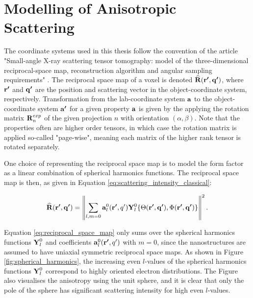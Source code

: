\section{Modelling of Anisotropic Scattering}
The coordinate systems used in this thesis follow the convention of the article "Small-angle X-ray scattering tensor tomography:
model of the three-dimensional reciprocal-space
map, reconstruction algorithm and angular
sampling requirements" \cite{liebi2018small}.
The reciprocal space map of a voxel is denoted $\bm{\mathrm{\widehat{R}}}(\bm{\mathrm{r'}}, \bm{\mathrm{q'}})$,
where $\bm{\mathrm{r'}}$ and $\bm{\mathrm{q'}}$ are the position and scattering vector in the object-coordinate system, respectively.
Transformation from the lab-coordinate system $\bm{\mathrm{a}}$ to the object-coordinate system $\bm{\mathrm{a'}}$ for a given property $\bm{\mathrm{a}}$
is given by the applying the rotation matrix $\bm{\mathrm{R}}_{n}^{exp}$ of the given projection $n$ with orientation $\left(\alpha,\beta\right)$.
Note that the properties often are higher order tensors, in which case the rotation matrix is applied so-called "page-wise",
meaning each matrix of the higher rank tensor is rotated separately.


One choice of representing the reciprocal space map is to model the form factor as a linear combination of spherical harmonics functions.
The reciprocal space map is then,
as given in Equation \eqref{eq:scattering_intensity_classical}:

\begin{equation}\label{eq:reciprocal_space_map}
    \bm{\mathrm{\widehat{R}}}(\bm{\mathrm{r'}}, \bm{\mathrm{q'}}) = \left\| \sum_{l, m=0} \bm{\mathrm{a}}_{l}^{0}(\bm{\mathrm{r'}}, q') \bm{\mathrm{Y}}_{l}^{0} \{ \Theta(\bm{\mathrm{r'}}, \bm{\mathrm{q'}}), \Phi(\bm{\mathrm{r'}}, \bm{\mathrm{q'}}) \} \right\|^{2}.
\end{equation}

Equation \eqref{eq:reciprocal_space_map} only sums over the spherical harmonics functions $\bm{\mathrm{Y}}_{l}^{0}$ and coefficients $\bm{\mathrm{a}}_{l}^{0}(\bm{\mathrm{r'}}, q')$ with $m=0$,
since the nanostructures are assumed to have uniaxial symmetric reciprocal space maps.
As shown in Figure \ref{fig:spherical_harmonics}, the increasing even $l$-values of the spherical harmonics functions $\bm{\mathrm{Y}}_{l}^{0}$ correspond to highly oriented electron distributions.
The Figure also visualises the anisotropy using the unit sphere, and it is clear that only the pole of the sphere has significant scattering intensity for high even $l$-values.

